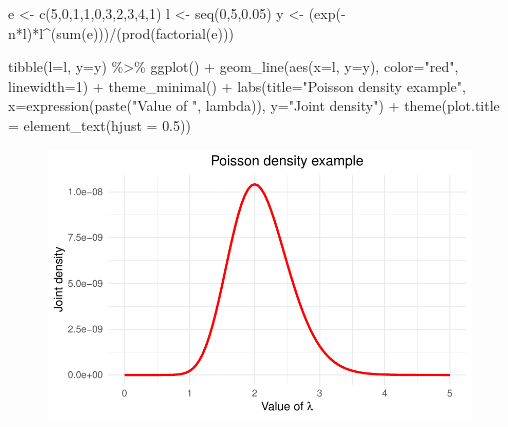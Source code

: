 \documentclass[
  letterpaper,
]{book}
\newenvironment{Shaded}{\begin{snugshade}}{\end{snugshade}}
\newcommand{\AttributeTok}[1]{\textcolor[rgb]{0.40,0.45,0.13}{#1}}
\newcommand{\DecValTok}[1]{\textcolor[rgb]{0.68,0.00,0.00}{#1}}
\newcommand{\FloatTok}[1]{\textcolor[rgb]{0.68,0.00,0.00}{#1}}
\newcommand{\FunctionTok}[1]{\textcolor[rgb]{0.28,0.35,0.67}{#1}}
\newcommand{\NormalTok}[1]{\textcolor[rgb]{0.00,0.23,0.31}{#1}}
\newcommand{\OtherTok}[1]{\textcolor[rgb]{0.00,0.23,0.31}{#1}}
\newcommand{\SpecialCharTok}[1]{\textcolor[rgb]{0.37,0.37,0.37}{#1}}
\newcommand{\StringTok}[1]{\textcolor[rgb]{0.13,0.47,0.30}{#1}}
\begin{document}
\begin{Shaded}
\begin{Highlighting}[]
\NormalTok{e }\OtherTok{\textless{}{-}} \FunctionTok{c}\NormalTok{(}\DecValTok{5}\NormalTok{,}\DecValTok{0}\NormalTok{,}\DecValTok{1}\NormalTok{,}\DecValTok{1}\NormalTok{,}\DecValTok{0}\NormalTok{,}\DecValTok{3}\NormalTok{,}\DecValTok{2}\NormalTok{,}\DecValTok{3}\NormalTok{,}\DecValTok{4}\NormalTok{,}\DecValTok{1}\NormalTok{)}
\NormalTok{l }\OtherTok{\textless{}{-}} \FunctionTok{seq}\NormalTok{(}\DecValTok{0}\NormalTok{,}\DecValTok{5}\NormalTok{,}\FloatTok{0.05}\NormalTok{)}
\NormalTok{y }\OtherTok{\textless{}{-}}\NormalTok{ (}\FunctionTok{exp}\NormalTok{(}\SpecialCharTok{{-}}\NormalTok{n}\SpecialCharTok{*}\NormalTok{l)}\SpecialCharTok{*}\NormalTok{l}\SpecialCharTok{\^{}}\NormalTok{(}\FunctionTok{sum}\NormalTok{(e)))}\SpecialCharTok{/}\NormalTok{(}\FunctionTok{prod}\NormalTok{(}\FunctionTok{factorial}\NormalTok{(e)))}

\FunctionTok{tibble}\NormalTok{(}\AttributeTok{l=}\NormalTok{l, }\AttributeTok{y=}\NormalTok{y) }\SpecialCharTok{\%\textgreater{}\%}
  \FunctionTok{ggplot}\NormalTok{() }\SpecialCharTok{+}
  \FunctionTok{geom\_line}\NormalTok{(}\FunctionTok{aes}\NormalTok{(}\AttributeTok{x=}\NormalTok{l, }\AttributeTok{y=}\NormalTok{y), }\AttributeTok{color=}\StringTok{"red"}\NormalTok{, }\AttributeTok{linewidth=}\DecValTok{1}\NormalTok{) }\SpecialCharTok{+}
  \FunctionTok{theme\_minimal}\NormalTok{() }\SpecialCharTok{+}
  \FunctionTok{labs}\NormalTok{(}\AttributeTok{title=}\StringTok{"Poisson density example"}\NormalTok{,}
       \AttributeTok{x=}\FunctionTok{expression}\NormalTok{(}\FunctionTok{paste}\NormalTok{(}\StringTok{"Value of "}\NormalTok{, lambda)),}
       \AttributeTok{y=}\StringTok{"Joint density"}\NormalTok{) }\SpecialCharTok{+}
  \FunctionTok{theme}\NormalTok{(}\AttributeTok{plot.title =} \FunctionTok{element\_text}\NormalTok{(}\AttributeTok{hjust =} \FloatTok{0.5}\NormalTok{))}
\end{Highlighting}
\end{Shaded}

\begin{figure}[H]

{\centering \includegraphics{CK_files/figure-pdf/unnamed-chunk-2-1.pdf}

}

\end{figure}
\end{document}
